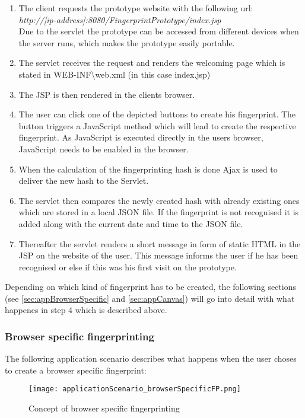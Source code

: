 \begin{enumerate}
	\item The client requests the prototype website with the following url:\\ \textit{http://[ip-address]:8080/FingerprintPrototype/index.jsp}\\
	Due to the servlet the prototype can be accessed from different devices when the server runs, which makes the prototype easily portable.
	\item The servlet receives the request and renders the welcoming page which is stated in WEB-INF\textbackslash web.xml (in this case index.jsp)
	\item The JSP is then rendered in the clients browser.
	\item The user can click one of the depicted buttons to create his fingerprint. The button triggers a JavaScript method which will lead to create the respective fingerprint. As JavaScript is executed directly in the users browser, JavaScript needs to be enabled in the browser.
	\item When the calculation of the fingerprinting hash is done Ajax is used to deliver the new hash to the Servlet.
	\item The servlet then compares the newly created hash with already existing ones which are stored in a local JSON file. If the fingerprint is not recognised it is added along with the current date and time to the JSON file.
	\item Thereafter the servlet renders a short message in form of static HTML in the JSP on the website of the user. This message informs the user if he has been recognised or else if this was his first visit on the prototype.\\
\end{enumerate}
Depending on which kind of fingerprint has to be created, the following sections (see \autoref{sec:appBrowserSpecific} and \autoref{sec:appCanvas}) will go into detail with what happenes in step 4 which is described above.


\subsubsection{Browser specific fingerprinting}\label{sec:appBrowserSpecific}

The following application scenario describes what happens when the user choses to create a browser specific fingerprint:

\begin{figure}[H]
	\centering
	\texttt{[image: applicationScenario\_browserSpecificFP.png]}
	\caption{Concept of browser specific fingerprinting\\}
	\label{ConceptBrowserSpecificFingerprinting}
\end{figure}

